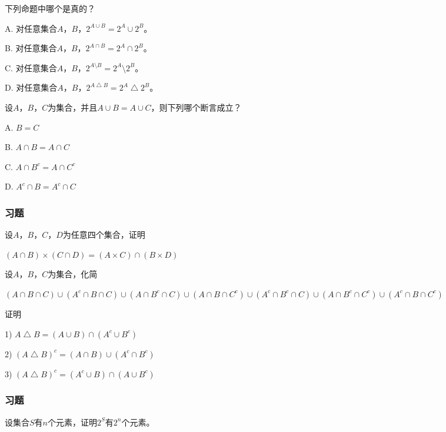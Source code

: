\documentclass{beamer}
\begin{document}
\begin{CJK*}{UTF8}{gbsn}
\begin{frame}
  \begin{Exercise}
下列命题中哪个是真的？

A. 对任意集合$A$，$B$，$2^{A\cup B} = 2^A \cup 2^B$。

B. 对任意集合$A$，$B$，$2^{A\cap B} = 2^A \cap 2^B$。

C. 对任意集合$A$，$B$，$2^{A\setminus B} = 2^A \setminus 2^B$。

D. 对任意集合$A$，$B$，$2^{A\bigtriangleup B} = 2^A \bigtriangleup 2^B$。
  \end{Exercise}
  \begin{Exercise}
    设$A$，$B$，$C$为集合，并且$A\cup B = A \cup C$，则下列哪个断言成立？

    A. $B = C$

    B. $A \cap B = A \cap C$

    C. $A \cap B^c = A \cap C^c$

    D. $A^c \cap B = A^c \cap C$
  \end{Exercise}
\end{frame}
\begin{frame}
  \frametitle{习题}
  \begin{Exercise}
    设$A$，$B$，$C$，$D$为任意四个集合，证明

    $(A \cap B) \times (C \cap D) =
    (A\times C) \cap (B \times D)$
  \end{Exercise}
  \begin{Exercise}
   设$A$，$B$，$C$为集合，化简

$(A \cap B \cap C)\cup (A^c \cap B \cap C) \cup (A \cap B^c \cap C) \cup (A \cap B \cap C^c) \cup (A^c \cap B^c \cap C) \cup (A \cap B^c \cap C^c) \cup (A^c \cap B \cap C^c)$
  \end{Exercise}
  \begin{Exercise}
   证明

1) $A\bigtriangleup B = (A\cup B) \cap (A^c \cup B^c)$

2) $(A \bigtriangleup B)^c = (A \cap B) \cup (A^c \cap B^c)$

3) $(A \bigtriangleup B)^c = (A^c \cup B) \cap (A \cup B^c)$
  \end{Exercise}  
\end{frame}

\begin{frame}
  \frametitle{习题}
  \begin{Exercise}
    设集合$S$有$n$个元素，证明$2^S$有$2^n$个元素。
  \end{Exercise}  
\end{frame}


\end{CJK*}
\end{document}
